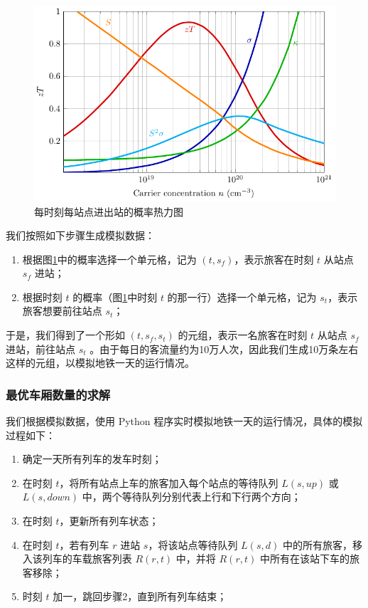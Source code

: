 \documentclass[12pt,a4paper]{mcmthesis}
\begin{document}
    \begin{figure}[h]
        \centerline{\includegraphics[scale=0.4]{figures/fig1}\quad}
        \caption{\song\wuhao 每时刻每站点进出站的概率热力图}
        \label{fig:p1_heatmap}
    \end{figure}

    我们按照如下步骤生成模拟数据：

    \begin{enumerate}
        \item 根据图\ref{fig:p1_heatmap}中的概率选择一个单元格，记为 $(t,s_f)$，表示旅客在时刻 $t$ 从站点 $s_f$ 进站；
        \item 根据时刻 $t$ 的概率（图\ref{fig:p1_heatmap}中时刻 $t$ 的那一行）选择一个单元格，记为 $s_t$，表示旅客想要前往站点 $s_t$；
    \end{enumerate}

    于是，我们得到了一个形如 $(t,s_f,s_t)$ 的元组，表示一名旅客在时刻 $t$ 从站点 $s_f$ 进站，前往站点 $s_t$ 。由于每日的客流量约为10万人次，因此我们生成10万条左右这样的元组，以模拟地铁一天的运行情况。

    \subsubsection{最优车厢数量的求解}

    我们根据模拟数据，使用 Python 程序实时模拟地铁一天的运行情况，具体的模拟过程如下：

    \begin{enumerate}
        \item 确定一天所有列车的发车时刻；
        \item 在时刻 $t$，将所有站点上车的旅客加入每个站点的等待队列 $L(s,up)$ 或 $L(s,down)$ 中，两个等待队列分别代表上行和下行两个方向；
        \item 在时刻 $t$，更新所有列车状态；
        \item 在时刻 $t$，若有列车 $r$ 进站 $s$，将该站点等待队列 $L(s,d)$ 中的所有旅客，移入该列车的车载旅客列表 $R(r,t)$ 中，并将 $R(r,t)$ 中所有在该站下车的旅客移除；
        \item 时刻 $t$ 加一，跳回步骤2，直到所有列车结束；
    \end{enumerate}
\end{document}
